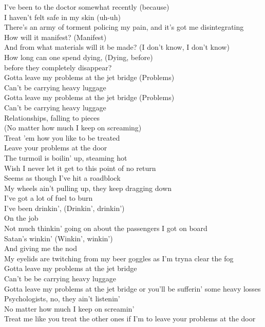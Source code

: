 


I've been to the doctor somewhat recently (because)\\
I haven't felt safe in my skin (uh-uh)\\
There's an army of torment policing my pain, and it's got me disintegrating\\
How will it manifest? (Manifest)\\
And from what materials will it be made? (I don't know, I don't know)\\
How long can one spend dying, (Dying, before)\\
before they completely disappear?\\

Gotta leave my problems at the jet bridge (Problems)\\
Can't be carrying heavy luggage\\
Gotta leave my problems at the jet bridge (Problems)\\
Can't be carrying heavy luggage\\
Relationships, falling to pieces\\
(No matter how much I keep on screaming)\\
Treat 'em how you like to be treated\\
Leave your problems at the door\\

The turmoil is boilin' up, steaming hot\\
Wish I never let it get to this point of no return\\
Seems as though I've hit a roadblock\\
My wheels ain't pulling up, they keep dragging down\\
I've got a lot of fuel to burn\\
I've been drinkin', (Drinkin', drinkin')\\
On the job\\
Not much thinkin' going on about the passengers I got on board\\
Satan's winkin' (Winkin', winkin')\\
And giving me the nod\\
My eyelids are twitching from my beer goggles as I'm tryna clear the fog\\

Gotta leave my problems at the jet bridge\\
Can't be be carrying heavy luggage\\
Gotta leave my problems at the jet bridge or you'll be sufferin' some heavy losses\\
Psychologists, no, they ain't listenin'\\
No matter how much I keep on screamin'\\
Treat me like you treat the other ones if I'm to leave your problems at the door\\

